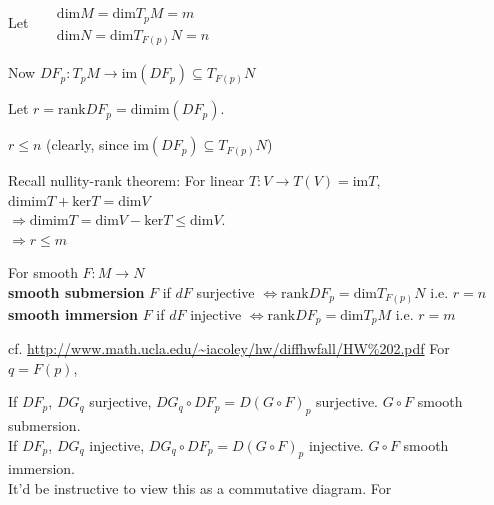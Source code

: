 Let \quad \, $\begin{aligned} & \quad \\
 &  \text{dim}M = \text{dim}T_pM = m \\
 &  \text{dim}N = \text{dim}T_{F(p)}N = n 
\end{aligned}$

Now $DF_p : T_pM \to \text{im}(DF_p) \subseteq T_{F(p)}N$

Let $r = \text{rank}DF_p = \text{dim}\text{im}(DF_p)$.  

$r\leq n$ (clearly, since $\text{im}(DF_p) \subseteq T_{F(p)}N$)

Recall nullity-rank theorem: For linear $T: V \to T(V) = \text{im}T$, \\
\phantom{Recall} $\text{dim}\text{im}T + \text{ker}T = \text{dim}V$ \\
\phantom{Recall} $\Longrightarrow \text{dim}\text{im}T = \text{dim}V - \text{ker}T \leq \text{dim}V$.  \\
$\Longrightarrow r \leq m$

\begin{definition}
        For smooth $F: M \to N$ \\
        \textbf{smooth submersion} $F$ if $dF$ surjective $\Longleftrightarrow  \text{rank}DF_p = \text{dim} T_{F(p)}N$ i.e. $r=n$ \\
        \textbf{smooth immersion} $F$ if $dF$ injective $\Longleftrightarrow  \text{rank}DF_p = \text{dim} T_{p}M$ i.e. $r=m$ \\
\end{definition}

 cf. \url{http://www.math.ucla.edu/~iacoley/hw/diffhwfall/HW%202.pdf} For $q=F(p)$,

If $DF_p$, $DG_q$ surjective, $DG_q\circ DF_p = D(G\circ F)_p$ surjective.  $G\circ F$ smooth submersion.  \\
If $DF_p$, $DG_q$ injective, $DG_q\circ DF_p = D(G\circ F)_p$ injective.  $G\circ F$ smooth immersion.   \\

It'd be instructive to view this as a commutative diagram.  For 

